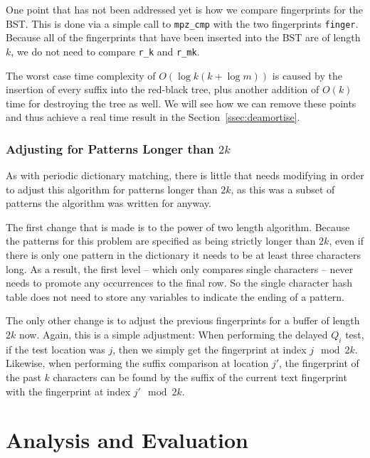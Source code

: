 \documentclass[ %
                    author={Dominic Joseph Moylett},
                    degree={MEng},
                     title={Dictionary Matching with Fingerprints},
                  subtitle={An Empirical Analysis},
                      type={research},
                      year={2015} ]{dissertation}
\begin{document}
One point that has not been addressed yet is how we compare fingerprints for the BST. This is done via a simple call to \texttt{mpz\_cmp} with the two fingerprints \texttt{finger}. Because all of the fingerprints that have been inserted into the BST are of length $k$, we do not need to compare \texttt{r\_k} and \texttt{r\_mk}.

The worst case time complexity of $O(\log k(k + \log m))$ is caused by the insertion of every suffix into the red-black tree, plus another addition of $O(k)$ time for destroying the tree as well. We will see how we can remove these points and thus achieve a real time result in the Section~\ref{ssec:deamortise}.

\subsection{Adjusting for Patterns Longer than $2k$}

As with periodic dictionary matching, there is little that needs modifying in order to adjust this algorithm for patterns longer than $2k$, as this was a subset of patterns the algorithm was written for anyway.

The first change that is made is to the power of two length algorithm. Because the patterns for this problem are specified as being strictly longer than $2k$, even if there is only one pattern in the dictionary it needs to be at least three characters long. As a result, the first level -- which only compares single characters -- never needs to promote any occurrences to the final row. So the single character hash table does not need to store any variables to indicate the ending of a pattern.

The only other change is to adjust the previous fingerprints for a buffer of length $2k$ now. Again, this is a simple adjustment: When performing the delayed $Q_i$ test, if the test location was $j$, then we simply get the fingerprint at index $j \mod 2k$. Likewise, when performing the suffix comparison at location $j'$, the fingerprint of the past $k$ characters can be found by the suffix of the current text fingerprint with the fingerprint at index $j' \mod 2k$.


\chapter{Analysis and Evaluation}
\label{chap:evaluation}
\end{document}
